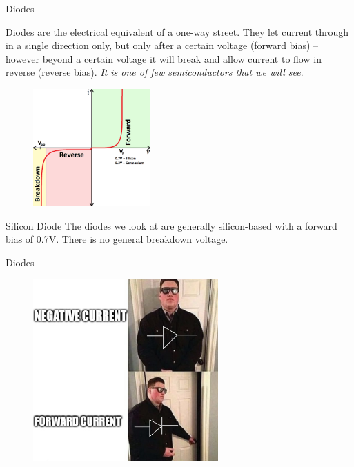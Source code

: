 \documentclass[../Main.tex]{subfiles}
\begin{document}
\begin{frame}{Diodes}
\begin{multicols}{2}
    Diodes are the electrical equivalent of a one-way street. They let current through in a single direction only, but only after a certain voltage (forward bias) -- however beyond a certain voltage it will break and allow current to flow in reverse (reverse bias). \emph{It is one of few semiconductors that we will see}.
    
    \columnbreak
\begin{figure}
    \centering
    \includegraphics[height=4.5cm]{Electricity_Images/IV_Diode.png}
\end{figure}
\end{multicols}

    \begin{block}{Silicon Diode}
        The diodes we look at are generally silicon-based with a forward bias of 0.7V. There is no general breakdown voltage.
    \end{block}
\end{frame}

\begin{frame}{Diodes}
    
        \begin{figure}
            \includegraphics[height=7cm]{Electricity_Images/persuadable_bouncer_diode.png}
            \end{figure}
\end{frame}
\end{document}
